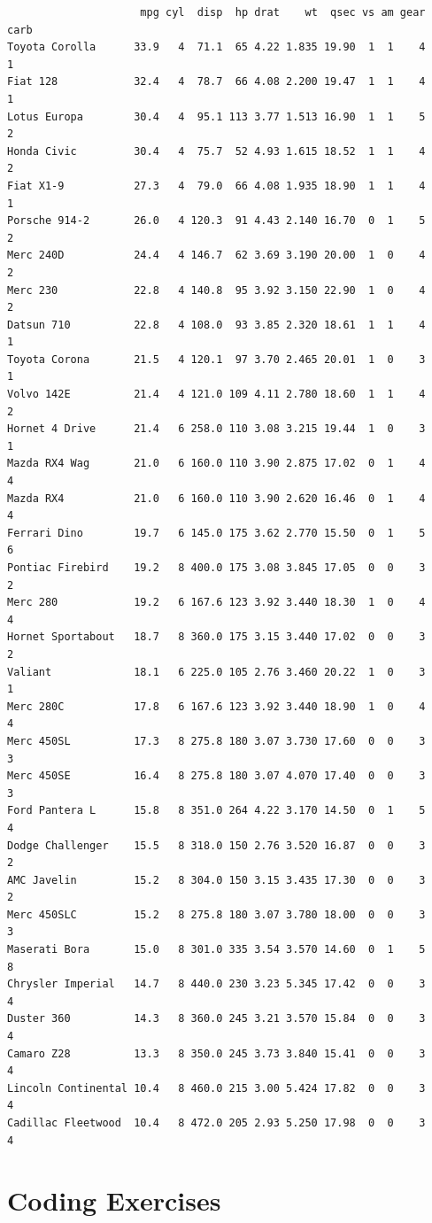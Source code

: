 \documentclass[
  letterpaper,
  DIV=11,
  numbers=noendperiod]{scrreprt}
\begin{document}
\begin{verbatim}
                     mpg cyl  disp  hp drat    wt  qsec vs am gear carb
Toyota Corolla      33.9   4  71.1  65 4.22 1.835 19.90  1  1    4    1
Fiat 128            32.4   4  78.7  66 4.08 2.200 19.47  1  1    4    1
Lotus Europa        30.4   4  95.1 113 3.77 1.513 16.90  1  1    5    2
Honda Civic         30.4   4  75.7  52 4.93 1.615 18.52  1  1    4    2
Fiat X1-9           27.3   4  79.0  66 4.08 1.935 18.90  1  1    4    1
Porsche 914-2       26.0   4 120.3  91 4.43 2.140 16.70  0  1    5    2
Merc 240D           24.4   4 146.7  62 3.69 3.190 20.00  1  0    4    2
Merc 230            22.8   4 140.8  95 3.92 3.150 22.90  1  0    4    2
Datsun 710          22.8   4 108.0  93 3.85 2.320 18.61  1  1    4    1
Toyota Corona       21.5   4 120.1  97 3.70 2.465 20.01  1  0    3    1
Volvo 142E          21.4   4 121.0 109 4.11 2.780 18.60  1  1    4    2
Hornet 4 Drive      21.4   6 258.0 110 3.08 3.215 19.44  1  0    3    1
Mazda RX4 Wag       21.0   6 160.0 110 3.90 2.875 17.02  0  1    4    4
Mazda RX4           21.0   6 160.0 110 3.90 2.620 16.46  0  1    4    4
Ferrari Dino        19.7   6 145.0 175 3.62 2.770 15.50  0  1    5    6
Pontiac Firebird    19.2   8 400.0 175 3.08 3.845 17.05  0  0    3    2
Merc 280            19.2   6 167.6 123 3.92 3.440 18.30  1  0    4    4
Hornet Sportabout   18.7   8 360.0 175 3.15 3.440 17.02  0  0    3    2
Valiant             18.1   6 225.0 105 2.76 3.460 20.22  1  0    3    1
Merc 280C           17.8   6 167.6 123 3.92 3.440 18.90  1  0    4    4
Merc 450SL          17.3   8 275.8 180 3.07 3.730 17.60  0  0    3    3
Merc 450SE          16.4   8 275.8 180 3.07 4.070 17.40  0  0    3    3
Ford Pantera L      15.8   8 351.0 264 4.22 3.170 14.50  0  1    5    4
Dodge Challenger    15.5   8 318.0 150 2.76 3.520 16.87  0  0    3    2
AMC Javelin         15.2   8 304.0 150 3.15 3.435 17.30  0  0    3    2
Merc 450SLC         15.2   8 275.8 180 3.07 3.780 18.00  0  0    3    3
Maserati Bora       15.0   8 301.0 335 3.54 3.570 14.60  0  1    5    8
Chrysler Imperial   14.7   8 440.0 230 3.23 5.345 17.42  0  0    3    4
Duster 360          14.3   8 360.0 245 3.21 3.570 15.84  0  0    3    4
Camaro Z28          13.3   8 350.0 245 3.73 3.840 15.41  0  0    3    4
Lincoln Continental 10.4   8 460.0 215 3.00 5.424 17.82  0  0    3    4
Cadillac Fleetwood  10.4   8 472.0 205 2.93 5.250 17.98  0  0    3    4
\end{verbatim}

\section{Coding Exercises}\label{coding-exercises}
\end{document}
